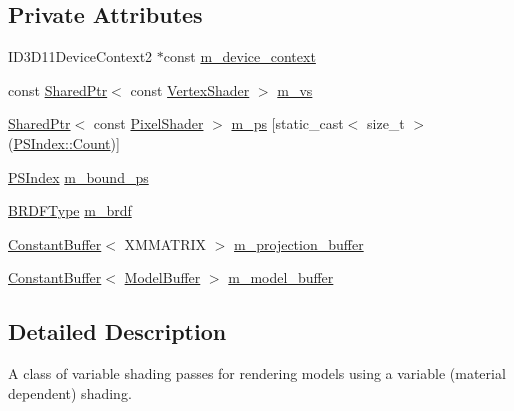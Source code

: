 \subsection*{Private Attributes}
\begin{DoxyCompactItemize}
\item 
I\+D3\+D11\+Device\+Context2 $\ast$const \hyperlink{classmage_1_1_variable_shading_pass_afff786ea38b64ba069866fdd6b525ba7}{m\+\_\+device\+\_\+context}
\item 
const \hyperlink{namespacemage_a1e01ae66713838a7a67d30e44c67703e}{Shared\+Ptr}$<$ const \hyperlink{classmage_1_1_vertex_shader}{Vertex\+Shader} $>$ \hyperlink{classmage_1_1_variable_shading_pass_aa91a1e8628c2f671adadd919376aa67e}{m\+\_\+vs}
\item 
\hyperlink{namespacemage_a1e01ae66713838a7a67d30e44c67703e}{Shared\+Ptr}$<$ const \hyperlink{namespacemage_a27ecaf266420ee7a494d64edc0757129}{Pixel\+Shader} $>$ \hyperlink{classmage_1_1_variable_shading_pass_aacd5b6b967a0fcfe7510e289c3d630a0}{m\+\_\+ps} \mbox{[}static\+\_\+cast$<$ size\+\_\+t $>$(\hyperlink{classmage_1_1_variable_shading_pass_a49519e421ac5be93136d9efdbf075d4aae93f994f01c537c4e2f7d8528c3eb5e9}{P\+S\+Index\+::\+Count})\mbox{]}
\item 
\hyperlink{classmage_1_1_variable_shading_pass_a49519e421ac5be93136d9efdbf075d4a}{P\+S\+Index} \hyperlink{classmage_1_1_variable_shading_pass_acb1d0d78a9de9afc2d668d87134c5ec5}{m\+\_\+bound\+\_\+ps}
\item 
\hyperlink{namespacemage_ae7a7a03a7b34d7e2689689bb8295cd38}{B\+R\+D\+F\+Type} \hyperlink{classmage_1_1_variable_shading_pass_ac6147f2068fd7727fe2d78584ff68767}{m\+\_\+brdf}
\item 
\hyperlink{structmage_1_1_constant_buffer}{Constant\+Buffer}$<$ X\+M\+M\+A\+T\+R\+IX $>$ \hyperlink{classmage_1_1_variable_shading_pass_afb777eb7b7303dd50337f361f82a919a}{m\+\_\+projection\+\_\+buffer}
\item 
\hyperlink{structmage_1_1_constant_buffer}{Constant\+Buffer}$<$ \hyperlink{structmage_1_1_model_buffer}{Model\+Buffer} $>$ \hyperlink{classmage_1_1_variable_shading_pass_ab83602f0ffa6c0a3519ffaa467ae113a}{m\+\_\+model\+\_\+buffer}
\end{DoxyCompactItemize}


\subsection{Detailed Description}
A class of variable shading passes for rendering models using a variable (material dependent) shading. 

